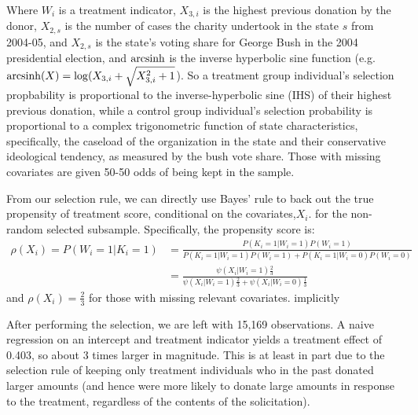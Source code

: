 \documentclass{article}
\begin{document}
Where $W_i$ is a treatment indicator, $X_{3,i}$ is the highest previous donation by the donor, $X_{2,s}$ is the number of cases the charity undertook in the state $s$ from 2004-05, and $X_{2,s}$ is the state's voting share for George Bush in the 2004 presidential election, and $\mathrm{arcsinh}$ is the inverse hyperbolic sine function (e.g. $\mathrm{arcsinh}(X) = \log(X_{3,i} + \sqrt{X_{3,i} ^ 2 + 1}$).
So a treatment group individual's selection propbability is proportional to the inverse-hyperbolic sine (IHS) of their highest previous donation, while a control group individual's selection probability is proportional to a complex trigonometric function of state characteristics, specifically, the caseload of the organization in the state and their conservative ideological tendency, as measured by the bush vote share. Those with missing covariates are given 50-50 odds of being kept in the sample.

From our selection rule, we can directly use Bayes' rule to back out the true propensity of treatment score, conditional on the covariates,$X_i$. for the non-random selected subsample. Specifically, the propensity score is:
\begin{align*}
\rho(X_i) = P(W_i=1|K_i=1) &= \frac{P(K_i=1|W_i=1)P(W_i=1) }{P(K_i=1|W_i=1)P(W_i=1) + P(K_i=1|W_i=0)P(W_i=0) } \\
 &= \frac{\psi(X_i|W_i=1)\frac{2}{3}}{ \psi(X_i|W_i=1)\frac{2}{3} + \psi(X_i|W_i=0)\frac{1}{3}}
\end{align*}
and $\rho(X_i)=\frac{2}{3}$ for those with missing relevant covariates. implicitly

After performing the selection, we are left with 15,169 observations. A naive regression on an intercept and treatment indicator yields a treatment effect of 0.403, so about 3 times larger in magnitude. This is at least in part due to the selection rule of keeping only treatment individuals who in the past donated larger amounts (and hence were more likely to donate large amounts in response to the treatment, regardless of the contents of the solicitation).
\end{document}
